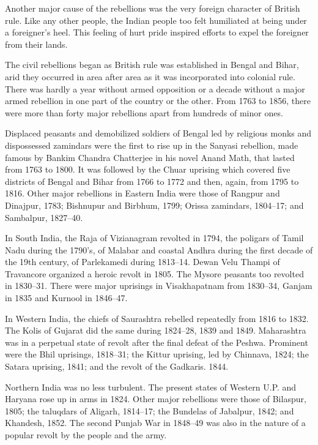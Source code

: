 \begin{multicols}{2}
Another major cause of the rebellions was the very foreign character of British rule. Like any other people, the Indian people too felt humiliated at being under a foreigner's heel. This feeling of hurt pride inspired efforts to expel the foreigner from their lands.

The civil rebellions began as British rule was established in Bengal and Bihar, arid they occurred in area after area as it was incorporated into colonial rule. There was hardly a year without armed opposition or a decade without a major armed rebellion in one part of the country or the other. From 1763 to 1856, there were more than forty major rebellions apart from hundreds of minor ones.

Displaced peasants and demobilized soldiers of Bengal led by religious monks and dispossessed zamindars were the first to rise up in the Sanyasi rebellion, made famous by Bankim Chandra Chatterjee in his novel Anand Math, that lasted from 1763 to 1800. It was followed by the Chuar uprising which covered five districts of Bengal and Bihar from 1766 to 1772 and then, again, from 1795 to 1816. Other major rebellions in Eastern India were those of Rangpur and Dinajpur, 1783; Bishnupur and Birbhum, 1799; Orissa zamindars, 1804--17; and Sambalpur, 1827--40.

In South India, the Raja of Vizianagram revolted in 1794, the poligars of Tamil Nadu during the 1790's, of Malabar and coastal Andhra during the first decade of the 19th century, of Parlekamedi during 1813--14. Dewan Velu Thampi of Travancore organized a heroic revolt in 1805. The Mysore peasants too revolted in 1830--31. There were major uprisings in Visakhapatnam from 1830--34, Ganjam in 1835 and Kurnool in 1846--47.

In Western India, the chiefs of Saurashtra rebelled repeatedly from 1816 to 1832. The Kolis of Gujarat did the same during 1824--28, 1839 and 1849. Maharashtra was in a perpetual state of revolt after the final defeat of the Peshwa. Prominent were the Bhil uprisings, 1818--31; the Kittur uprising, led by Chinnava, 1824; the Satara uprising, 1841; and the revolt of the Gadkaris. 1844.

Northern India was no less turbulent. The present states of Western U.P. and Haryana rose up in arms in 1824. Other major rebellions were those of Bilaspur, 1805; the taluqdars of Aligarh, 1814--17; the Bundelas of Jabalpur, 1842; and Khandesh, 1852. The second Punjab War in 1848--49 was also in the nature of a popular revolt by the people and the army.


\end{multicols}
